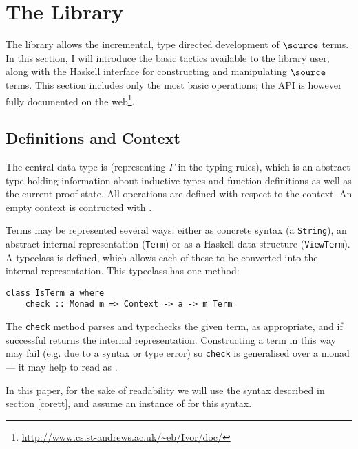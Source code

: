 \section{The \Ivor{} Library}


The \Ivor{} library allows the incremental, type directed development
of $\source$ terms.  In this section, I will introduce the basic
tactics available to the library user, along with the Haskell
interface for constructing and manipulating $\source$ terms. This
section includes only the most basic operations; the API is however
fully documented on the
web\footnote{\url{http://www.cs.st-andrews.ac.uk/~eb/Ivor/doc/}}.

\subsection{Definitions and Context}

The central data type is  (representing $\Gamma$ in the
typing rules), which is an abstract type holding information about
inductive types and function definitions as well as the current proof
state. All operations are defined with respect to the context. An
empty context is contructed with .

Terms may be represented several ways; either as concrete syntax (a
\texttt{String}), an abstract internal representation (\texttt{Term})
or as a Haskell data structure (\texttt{ViewTerm}). A typeclass
 is defined, which allows each of these to be converted
into the internal representation. This typeclass has one method:

\begin{verbatim}
class IsTerm a where
    check :: Monad m => Context -> a -> m Term
\end{verbatim}

The \texttt{check} method parses and typechecks the given term, as
appropriate, and if successful returns the internal representation. 
Constructing a term in this way may fail (e.g. due to a syntax or
type error) so \texttt{check} is generalised over a monad
 --- it may help to read  as .

In this paper, for the sake of readability we will use the syntax
described in section \ref{corett}, and assume an instance of
 for this syntax.

